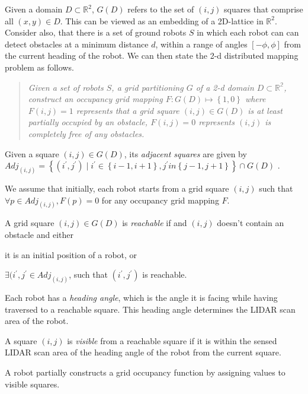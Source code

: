 Given a domain $D\subset\mathbb{R}^2$, $G(D)$ refers to the set of $(i,j)$ squares that comprise all $(x,y)\in D$. This can be viewed as an embedding of a 2D-lattice in $\mathbb{R}^2$. Consider also, that there is a set of ground robots $S$ in which each robot can can detect obstacles at a minimum distance $d$, within a range of angles $\left[-\phi,\phi\right]$ from the current heading of the robot. We can then state the 2-d distributed mapping problem as follows. \begin{quote}
 {\em Given a set of robots $S$, a grid partitioning $G$ of a 2-d domain $D\subset \mathbb{R^2}$, construct an occupancy grid mapping $F: G(D) \mapsto \left\{1,0\right\}$ where $F(i,j) = 1$ represents that a grid square $(i,j)\in G(D)$ is at least partially occupied by an obstacle, $F(i,j) = 0$ represents $(i,j)$ is completely free of any obstacles.}
\end{quote}
\begin{definition}
Given a square $(i,j) \in G(D)$, its \emph{adjacent squares} are given by
$\mathit{Adj}_{(i,j)} = \left\{(i^\prime, j^\prime) \mid i^\prime \in \left\{i - 1, i +1\right\}, j^\prime in \left\{j-1,j+1\right\} \right\} \cap G(D)$ .\end{definition} 
We assume that initially, each robot starts from a grid square $(i,j)$ such that $\forall p \in \mathit{Adj}_{(i,j)}, F(p) = 0$ for any occupancy grid mapping $F$.  

\begin{definition}
A grid square $(i,j)\in G(D)$ is \emph{reachable} if  and $(i,j)$ doesn't contain an obstacle and either \begin{inparaenum}[(a)]
\item it is an initial position of a robot, or 
\item $\exists (i^\prime,j^\prime \in \mathit{Adj}_{(i,j)} $, such that $(i^\prime, j^\prime)$ is reachable. 
\end{inparaenum}

\end{definition}
Each robot has a \emph{heading angle}, which is the angle it is facing while having traversed to a reachable square. This heading angle determines the LIDAR scan area of the robot.  
\begin{definition}
A square $(i,j)$ is \emph{visible} from a reachable square if it is within the sensed LIDAR scan area of the heading angle of the robot from the current square.  
\end{definition}
A robot partially constructs a grid occupancy function by assigning values to visible squares.

